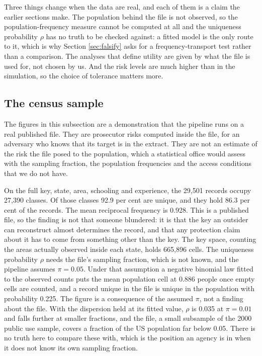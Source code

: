 \documentclass[11pt,a4paper]{article}
\theoremstyle{plain}
\theoremstyle{definition}
\theoremstyle{definition}
\theoremstyle{plain}
\begin{document}
Three things change when the data are real, and each of them is a claim the
earlier sections make. The population behind the file is not observed, so the
population-frequency measure cannot be computed at all and the uniqueness
probability $\rho$ has no truth to be checked against: a fitted model is the only route to it, which
is why Section \ref{sec:falsify} asks for a frequency-transport test rather than a
comparison. The analyses that define utility are given by what the file is used
for, not chosen by us. And the risk levels are much higher than in the simulation,
so the choice of tolerance matters more.

\subsection{The census sample}

The figures in this subsection are a demonstration that the pipeline runs on a
real published file. They are prosecutor risks computed inside the file, for an
adversary who knows that its target is in the extract. They are not an estimate
of the risk the file posed to the population, which a statistical office would
assess with the sampling fraction, the population frequencies and the access
conditions that we do not have.

On the full key, state, area, schooling and experience, the 29,501 records occupy
27,390 classes. Of those classes 92.9 per cent are unique, and they hold 86.3 per
cent of the records. The mean reciprocal frequency
is 0.928. This is a published file, so the finding is not that someone blundered:
it is that the key an outsider can reconstruct almost determines the record, and
that any protection claim about it has to come from something other than the key.
The key space, counting the areas actually observed inside each state, holds
665,896 cells. The uniqueness probability $\rho$ needs the file's sampling fraction, which
is not known, and the pipeline assumes $\pi = 0.05$. Under that assumption a
negative binomial law fitted to the observed counts puts the mean population
cell at 0.886 people once empty cells are counted, and a record unique in the
file is unique in the population with probability 0.225. The figure is a
consequence of the assumed $\pi$, not a finding about the file. With the
dispersion held at its fitted value, $\rho$ is 0.035 at $\pi = 0.01$ and falls further at smaller fractions, and the
file, a small subsample of the 2000 public use sample, covers a fraction of the
US population far below 0.05. There is no truth here to compare these with, which is the position an
agency is in when it does not know its own sampling fraction.
\end{document}
